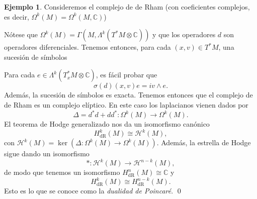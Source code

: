 \documentclass[12pt,a4paper]{article}
\theoremstyle{definition} \newtheorem{defn}[thm]{Definición}
\theoremstyle{definition} \newtheorem{ejemplo}[thm]{Ejemplo}
\theoremstyle{definition} \newtheorem{ejercicio}[thm]{Ejercicio}
\theoremstyle{remark} \newtheorem*{obs}{Observación}
\newcommand{\HH}{\mathcal{H}}
\newcommand{\CC}{\mathbb{C}}
\begin{document}
\begin{ejemplo}
  Consideremos el complejo de de Rham (con coeficientes complejos, es decir, $\Omega^k(M)=\Omega^k(M,\CC)$)
  \begin{center}
  \end{center}
  Nótese que $\Omega^k(M)=\Gamma(M,\Lambda^k(T^*M\otimes \CC))$ y que los operadores $d$ son operadores diferenciales. Tenemos entonces, para cada $(x,v)\in T^*M$, una sucesión de símbolos
  \begin{center}
  \end{center}
  Para cada $e\in \Lambda^k(T_x^*M\otimes \CC)$, es fácil probar que
  \begin{equation*}
    \sigma(d)(x,v)e=iv\wedge e.
  \end{equation*}
  Además, la sucesión de símbolos es exacta. Tenemos entonces que el complejo de de Rham es un complejo elíptico. En este caso los laplacianos vienen dados por
  \begin{equation*}
    \Delta=d^*d+dd^*:\Omega^k(M) \longrightarrow \Omega^k(M).
  \end{equation*}
  El teorema de Hodge generalizado nos da un isomorfismo canónico
  \begin{equation*}
    H^k_{\mathrm{dR}}(M) \cong \mathcal{H}^k(M),
  \end{equation*}
  con $\mathcal{H}^k(M)=\ker(\Delta:\Omega^k(M) \rightarrow \Omega^k(M))$.
  Además, la estrella de Hodge sigue dando un isomorfismo
  \begin{equation*}
    *:\HH^k(M) \longrightarrow \HH^{n-k}(M),
  \end{equation*}
  de modo que tenemos un isomorfismo $H_{\mathrm{dR}}^n(M) \cong \CC$ y 
  \begin{equation*}
    H_{\mathrm{dR}}^k(M) \cong H_{\mathrm{dR}}^{n-k}(M) .
  \end{equation*}
  Esto es lo que se conoce como la \emph{dualidad de Poincaré}. \qed
\end{ejemplo}
\end{document}
